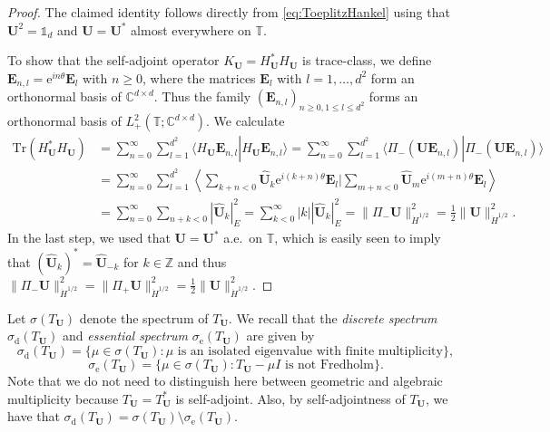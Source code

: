 \documentclass[10pt,reqno,a4paper]{amsart}
\theoremstyle{definition}
\theoremstyle{remark}
\theoremstyle{remark}
\numberwithin{equation}{section}
\newcommand{\C}{\mathbb{C}}
\newcommand{\Z}{\mathbb{Z}}
\newcommand{\T}{\mathbb{T}}
\newcommand{\eu}{\mathrm{e}}
\newcommand{\Ub}{\mathbf{U}}
\newcommand{\id}{I}
\newcommand{\Tr}{\mathrm{Tr}}
\newcommand{\sd}{\sigma_{\mathrm{d}}}
\newcommand{\se}{\sigma_{\mathrm{e}}}
\begin{document}
\begin{proof}
 The claimed identity follows directly from \eqref{eq:ToeplitzHankel} using that $\Ub^2 = \mathds{1}_d$ and $\Ub= \Ub^*$ almost everywhere on $\T$. 
  
 To show that the self-adjoint operator $K_\Ub=H^*_\Ub H_\Ub$ is trace-class, we define $\mathbf{E}_{n,l} = \eu^{i n \theta} \mathbf{E}_l$ with $n \geq 0$, where the matrices $\mathbf{E}_l$  with $l=1, \ldots, d^2$ form an orthonormal basis of $\C^{d \times d}$. Thus the family $(\mathbf{E}_{n,l})_{n \geq 0, 1 \leq l \leq d^2}$ forms an orthonormal basis of $L^2_+(\T; \C^{d \times d})$. We calculate 
\begin{align*}
\Tr(H_{\Ub}^* H_\Ub ) & = \sum_{n=0}^\infty \sum_{l=1}^{d^2} \langle H_\Ub \mathbf{E}_{n,l}| H_\Ub \mathbf{E}_{n,l}  \rangle = \sum_{n=0}^\infty \sum_{l=1}^{d^2} \langle \Pi_{-}(\Ub \mathbf{E}_{n,l}) | \Pi_-(\Ub \mathbf{E}_{n,l}) \rangle \\
& = \sum_{n=0}^\infty \sum_{l=1}^{d^2} \left \langle \sum_{k+n <0} \widehat{\Ub}_k \eu^{i (k+n)\theta} \mathbf{E}_l | \sum_{m + n <0} \widehat{\Ub}_m \eu^{i (m+n) \theta} \mathbf{E}_l \right \rangle \\
& = \sum_{n=0}^\infty \sum_{n+k <0} |\widehat{\Ub}_k|_E^2 = \sum_{k<0}^\infty |k| |\widehat{\Ub}_k|_E^2 =  \| \Pi_- \Ub \|_{\dot{H}^{1/2}}^2 = \frac{1}{2} \| \Ub \|_{\dot{H}^{1/2}}^2.
\end{align*}
In the last step, we used that $\Ub = \Ub^*$ a.e.~on $\T$, which is easily seen to imply that $(\widehat{\Ub}_{k})^* = \widehat{\Ub}_{-k}$ for $k \in \Z$ and thus $\| \Pi_- \Ub \|_{\dot{H}^{1/2}}^2 = \| \Pi_+ \Ub \|_{\dot{H}^{1/2}}^2 = \frac{1}{2} \| \Ub \|_{\dot{H}^{1/2}}^2$. 
\end{proof}

Let $\sigma(T_\Ub)$ denote the spectrum of $T_\Ub$. We recall that the {\em discrete spectrum} $\sd(T_\Ub)$ and {\em essential spectrum} $\se(T_\Ub)$ are given by
$$
\sd(T_{\Ub}) = \{ \mu \in \sigma(T_\Ub) : \mbox{$\mu$ is an isolated eigenvalue with finite multiplicity} \},
$$
$$
\se(T_\Ub) = \{ \mu \in \sigma(T_\Ub) : \mbox{$T_{\Ub}-\mu \id$ is not Fredholm} \}.
$$
Note that we do not need to distinguish here between geometric and algebraic multiplicity because $T_\Ub=T_{\Ub}^*$ is self-adjoint. Also, by self-adjointness of $T_\Ub$, we have that
$\sd(T_\Ub) = \sigma(T_\Ub) \setminus \se(T_\Ub)$.
\end{document}

